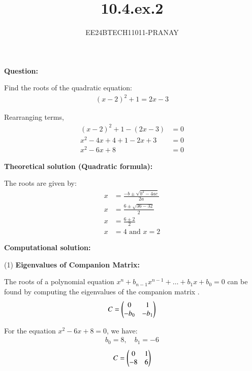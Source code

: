 \documentclass[journal]{IEEEtran}
\begin{document}

\vspace{3cm}

\title{10.4.ex.2}
\author{EE24BTECH11011-PRANAY}
{\let\newpage\relax\maketitle}

\renewcommand{\thefigure}{\theenumi}
\renewcommand{\thetable}{\theenumi}
\setlength{\intextsep}{10pt}

\renewcommand{\thetable}{\theenumi}

\textbf{Question:}

Find the roots of the quadratic equation:
\begin{align}
    (x-2)^2 + 1 = 2x - 3
\end{align}

\solution

Rearranging terms,
\begin{align}
    (x-2)^2 + 1 - (2x - 3) &= 0 \\
    x^2 - 4x + 4 + 1 - 2x + 3 &= 0 \\
    x^2 - 6x + 8 &= 0
\end{align}

\textbf{Theoretical solution (Quadratic formula):}

The roots are given by:
\begin{align}
    x &= \frac{-b \pm \sqrt{b^2 - 4ac}}{2a} \\
    x &= \frac{6 \pm \sqrt{36 - 32}}{2} \\
    x &= \frac{6 \pm 2}{2} \\
    x &= 4 \text{ and } x = 2
\end{align}

\textbf{Computational solution:}

(1) \textbf{Eigenvalues of Companion Matrix:}

The roots of a polynomial equation $x^n + b_{n-1}x^{n-1} + \dots + b_1x + b_0 = 0$ can be found by computing the eigenvalues of the companion matrix .
\begin{align}
    C = \begin{pmatrix}0 & 1 \\ -b_0 & -b_1\end{pmatrix}
\end{align}

For the equation $x^2 - 6x + 8 = 0$, we have:
\begin{align}
    b_0 = 8, \quad b_1 = -6
\end{align}
\begin{align}
    C = \begin{pmatrix}0 & 1 \\ -8 & 6\end{pmatrix}
\end{align}
\end{document}

